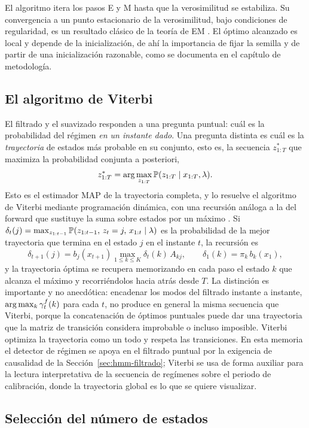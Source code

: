 El algoritmo itera los pasos E y M hasta que la verosimilitud se estabiliza. Su convergencia a un punto estacionario de la verosimilitud, bajo condiciones de regularidad, es un resultado clásico de la teoría de EM \cite{dempster1977}. El óptimo alcanzado es local y depende de la inicialización, de ahí la importancia de fijar la semilla y de partir de una inicialización razonable, como se documenta en el capítulo de metodología.

\subsection{El algoritmo de Viterbi}
\label{sec:hmm-viterbi}

El filtrado y el suavizado responden a una pregunta puntual: cuál es la probabilidad del régimen \emph{en un instante dado}. Una pregunta distinta es cuál es la \emph{trayectoria} de estados más probable en su conjunto, esto es, la secuencia $z_{1:T}^{\ast}$ que maximiza la probabilidad conjunta a posteriori,
\[
z_{1:T}^{\ast} = \arg\max_{z_{1:T}} \mathbb{P}(z_{1:T} \mid x_{1:T}, \lambda).
\]
Esto es el estimador MAP de la trayectoria completa, y lo resuelve el algoritmo de Viterbi mediante programación dinámica, con una recursión análoga a la del forward que sustituye la suma sobre estados por un máximo \cite{viterbi1967}. Si $\delta_t(j) = \max_{z_{1:t-1}} \mathbb{P}(z_{1:t-1},\, z_t = j,\, x_{1:t} \mid \lambda)$ es la probabilidad de la mejor trayectoria que termina en el estado $j$ en el instante $t$, la recursión es
\[
\delta_{t+1}(j) = b_j(x_{t+1}) \max_{1 \le k \le K} \delta_t(k)\, A_{kj},
\qquad \delta_1(k) = \pi_k\, b_k(x_1),
\]
y la trayectoria óptima se recupera memorizando en cada paso el estado $k$ que alcanza el máximo y recorriéndolos hacia atrás desde $T$. La distinción es importante y no anecdótica: encadenar los modos del filtrado instante a instante, $\arg\max_k \gamma^{f}_t(k)$ para cada $t$, no produce en general la misma secuencia que Viterbi, porque la concatenación de óptimos puntuales puede dar una trayectoria que la matriz de transición considera improbable o incluso imposible. Viterbi optimiza la trayectoria como un todo y respeta las transiciones. En esta memoria el detector de régimen se apoya en el filtrado puntual por la exigencia de causalidad de la Sección~\ref{sec:hmm-filtrado}; Viterbi se usa de forma auxiliar para la lectura interpretativa de la secuencia de regímenes sobre el periodo de calibración, donde la trayectoria global es lo que se quiere visualizar.

\subsection{Selección del número de estados}
\label{sec:hmm-K}

